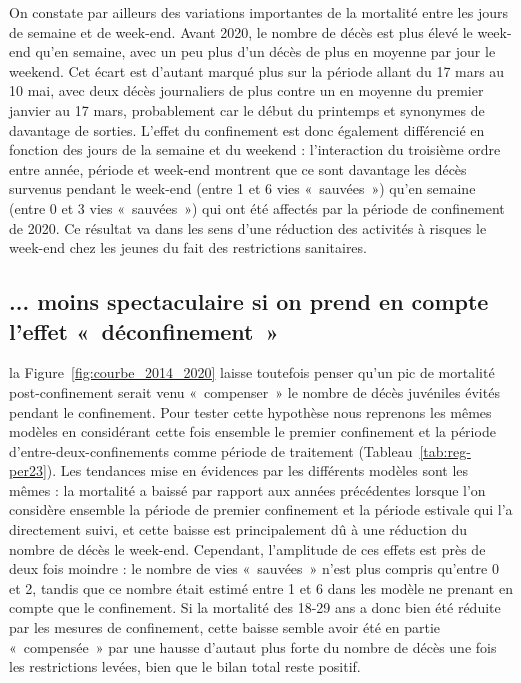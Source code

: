 \documentclass[titlepage]{article}
\begin{document}
On constate par ailleurs des variations importantes de la mortalité entre les jours de semaine et de week-end. Avant 2020, le nombre de décès est plus élevé le week-end qu'en semaine, avec un peu plus d'un décès de plus en moyenne par jour le weekend. Cet écart est d'autant marqué plus sur la période allant du 17 mars au 10 mai, avec deux décès journaliers de plus contre un en moyenne du premier janvier au 17 mars, probablement car le début du printemps et synonymes de davantage de sorties. L'effet du confinement est donc également différencié en fonction des jours de la semaine et du weekend : l'interaction du troisième ordre entre année, période et week-end montrent que ce sont davantage les décès survenus pendant le week-end (entre 1 et 6 vies « sauvées ») qu'en semaine (entre 0 et 3 vies « sauvées ») qui ont été affectés par la période de confinement de 2020. Ce résultat va dans les sens d'une réduction des activités à risques le week-end chez les jeunes du fait des restrictions sanitaires.   \\


\subsection{... moins spectaculaire si on prend en compte l'effet « déconfinement »}

la Figure \ref{fig:courbe_2014_2020} laisse toutefois penser qu'un pic de mortalité post-confinement serait venu « compenser » le nombre de décès juvéniles évités pendant le confinement. Pour tester cette hypothèse nous reprenons les mêmes modèles en considérant cette fois ensemble le premier confinement et la période d'entre-deux-confinements comme période de traitement (Tableau \ref{tab:reg-per23}). Les tendances mise en évidences par les différents modèles sont les mêmes : la mortalité a baissé par rapport aux années précédentes lorsque l'on considère ensemble la période de premier confinement et la période estivale qui l'a directement suivi, et cette baisse est principalement dû à une réduction du nombre de décès le week-end. Cependant, l'amplitude de ces effets est près de deux fois moindre : le nombre de vies « sauvées »  n'est plus compris qu'entre 0 et 2, tandis que ce nombre était estimé entre 1 et 6 dans les modèle ne prenant en compte que le confinement. Si la mortalité des 18-29 ans a donc bien été réduite par les mesures de confinement, cette baisse semble avoir été en partie « compensée » par une hausse d'autaut plus forte du nombre de décès une fois les restrictions levées, bien que le bilan total reste positif.
\end{document}
